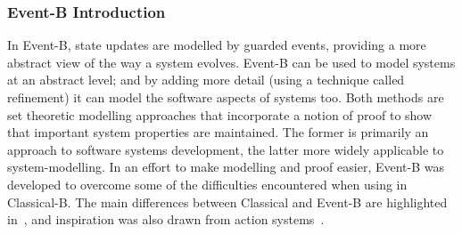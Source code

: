 \subsubsection{Event-B Introduction}
 In Event-B, state updates are modelled by guarded events, providing a more abstract view of the way a system evolves. Event-B can be used to model systems at an abstract level; and by adding more detail (using a technique called refinement) it can model the software aspects of systems too. Both methods are set theoretic modelling approaches that incorporate a notion of proof to show that important system properties are maintained. The former is primarily an approach to software systems development, the latter more widely applicable to system-modelling. In an effort to make modelling and proof easier, Event-B was developed to overcome some of the difficulties encountered when using in Classical-B. The main differences between Classical and Event-B are highlighted in~\cite{Hallerstede07}, and inspiration was also drawn from action systems~\cite{Back1990133}.


